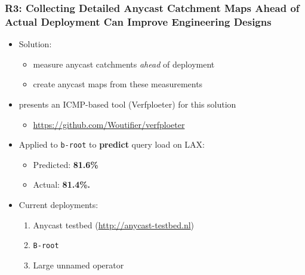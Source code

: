 \documentclass[11pt,show 
notes,notheorems,noamsthm,blank]{beamer} %
\begin{document}
\begin{frame}
 \frametitle{R3: Collecting Detailed Anycast Catchment Maps Ahead of Actual
    Deployment Can Improve Engineering Designs}
    
\begin{itemize}
\item Solution:
\begin{itemize}
  \item measure anycast catchments \textit{ahead } of deployment
  \item create anycast maps from these measurements
\end{itemize}


 \item \cite{Vries17b} presents an ICMP-based tool (Verfploeter) 
   for this solution
 \begin{itemize}
  \item \small \url{https://github.com/Woutifier/verfploeter}
 \end{itemize}


 \item Applied to  \texttt{b-root} to \textbf{predict} query load on LAX:
 
 \begin{itemize}
  \item Predicted: \textbf{81.6\% }
  \item Actual: \textbf{81.4\%.}
 \end{itemize}

 

\item Current deployments:

\begin{enumerate}
 \item Anycast testbed (\url{http://anycast-testbed.nl})
 \item \texttt{B-root}
 \item Large unnamed operator
\end{enumerate}


% 
%  
\end{itemize}


    
\end{frame}
\end{document}
